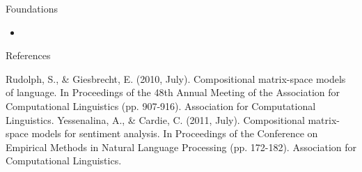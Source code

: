 \documentclass[12pt,a4paper]{beamer}
\begin{document}
\begin{frame}{Foundations}
\begin{itemize}
\item
\end{itemize}
\end{frame}



\begin{frame}[allowframebreaks]{References}
\begin{thebibliography}{-}
 Rudolph, S., \& Giesbrecht, E. (2010, July). Compositional matrix-space models of language. In Proceedings of the 48th Annual Meeting of the Association for Computational Linguistics (pp. 907-916). Association for Computational Linguistics.
 Yessenalina, A., \& Cardie, C. (2011, July). Compositional matrix-space models for sentiment analysis. In Proceedings of the Conference on Empirical Methods in Natural Language Processing (pp. 172-182). Association for Computational Linguistics.
\end{thebibliography}
\end{frame}
\end{document}
